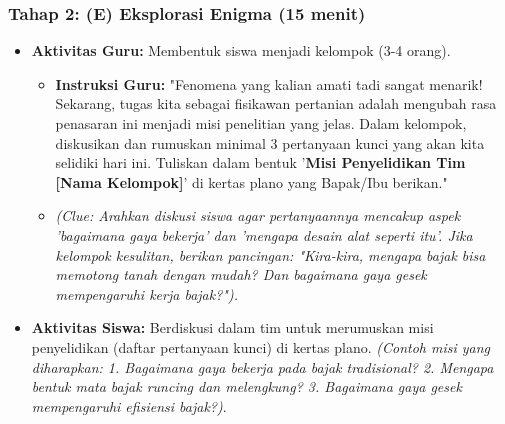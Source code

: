 \documentclass[12pt,a4paper]{article}
\begin{document}
\subsubsection{Tahap 2: (E) Eksplorasi Enigma (15 menit)}
\begin{itemize}
\item \textbf{Aktivitas Guru:} Membentuk siswa menjadi kelompok (3-4 orang).
    \begin{itemize}
    \item \textbf{Instruksi Guru:} "Fenomena yang kalian amati tadi sangat menarik! Sekarang, tugas kita sebagai fisikawan pertanian adalah mengubah rasa penasaran ini menjadi misi penelitian yang jelas. Dalam kelompok, diskusikan dan rumuskan minimal 3 pertanyaan kunci yang akan kita selidiki hari ini. Tuliskan dalam bentuk '\textbf{Misi Penyelidikan Tim [Nama Kelompok]}' di kertas plano yang Bapak/Ibu berikan."
    \item \textit{(Clue: Arahkan diskusi siswa agar pertanyaannya mencakup aspek 'bagaimana gaya bekerja' dan 'mengapa desain alat seperti itu'. Jika kelompok kesulitan, berikan pancingan: "Kira-kira, mengapa bajak bisa memotong tanah dengan mudah? Dan bagaimana gaya gesek mempengaruhi kerja bajak?").}
    \end{itemize}
\item \textbf{Aktivitas Siswa:} Berdiskusi dalam tim untuk merumuskan misi penyelidikan (daftar pertanyaan kunci) di kertas plano. \textit{(Contoh misi yang diharapkan: 1. Bagaimana gaya bekerja pada bajak tradisional? 2. Mengapa bentuk mata bajak runcing dan melengkung? 3. Bagaimana gaya gesek mempengaruhi efisiensi bajak?)}.
\end{itemize}
\end{document}

